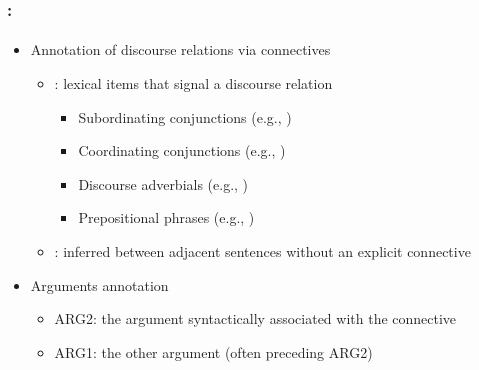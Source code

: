 \documentclass[xcolor=table]{beamer}
\begin{document}
\begin{frame}
	\frametitle{\insertshortsubtitle: \insertsection}
	\framesubtitle{\insertsubsection}
	
	\begin{itemize}
		\item Annotation of discourse relations via connectives
		\begin{itemize}
			\item {}: lexical items that signal a discourse relation
			\begin{itemize}
				\item Subordinating conjunctions (e.g., )
				\item Coordinating conjunctions (e.g., )
				\item Discourse adverbials (e.g., )
				\item Prepositional phrases (e.g., )
			\end{itemize}
			
			\item {}: inferred between adjacent sentences without an explicit connective
		\end{itemize}
		
		\item Arguments annotation
		\begin{itemize}
			\item ARG2: the argument syntactically associated with the connective
			\item ARG1: the other argument (often preceding ARG2)
		\end{itemize}
	\end{itemize}
	
\end{frame}
\end{document}

